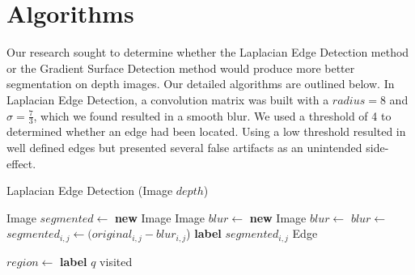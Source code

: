 
\section{Algorithms}
\label{sec:expts}

Our research sought to determine whether the Laplacian Edge Detection method or the Gradient Surface Detection method would produce more better segmentation on depth images. Our detailed algorithms are outlined below. In Laplacian Edge Detection, a convolution matrix was built with a $radius = 8$ and $\sigma = \frac{7}{3}$, which we found resulted in a smooth blur. We used a threshold of 4 to determined whether an edge had been located. Using a low threshold resulted in well defined edges but presented several false artifacts as an unintended side-effect.

\begin{algorithm}
\caption{Laplacian Edge Detection (Image $depth$)}\label{laplacian}
\begin{algorithmic}[1]
\State Image $segmented \gets$ \textbf{new} Image
\State Image  $blur \gets$ \textbf{new} Image
\State $blur \gets $ 
\State $blur \gets $ 
\State $segmented_{i, j} \gets (original_{i, j}-blur_{i, j}$)
\State \textbf{label} $segmented_{i,j}$ Edge
\EndIf
\EndFor
\item[]
\State $region \gets$  
\State \textbf{label} $q$ visited
\EndFor
\EndIf
\EndFor
\State {}
\end{algorithmic}
\end{algorithm}


